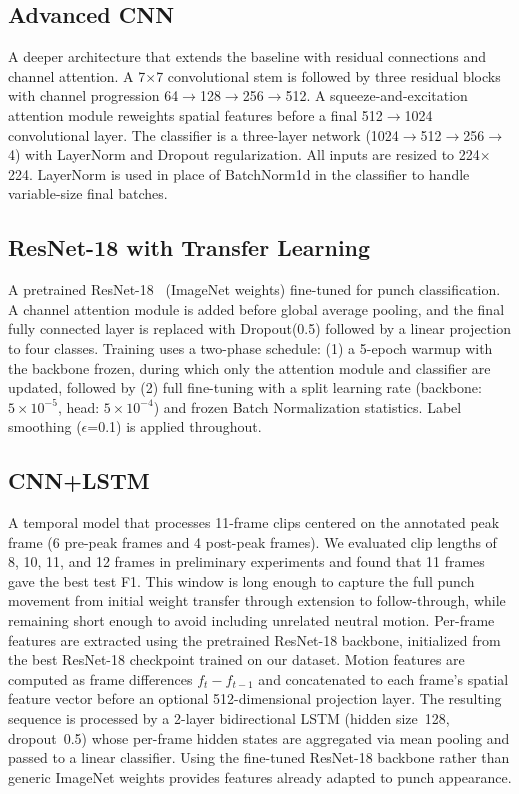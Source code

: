 \documentclass[conference]{IEEEtran}
\begin{document}
\subsection{Advanced CNN}
A deeper architecture that extends the baseline with residual connections and
channel attention. A 7$\times$7 convolutional stem is followed by three
residual blocks with channel progression 64$\to$128$\to$256$\to$512. A
squeeze-and-excitation attention module reweights spatial features before a
final 512$\to$1024 convolutional layer. The classifier is a three-layer
network (1024$\to$512$\to$256$\to$4) with LayerNorm and Dropout
regularization. All inputs are resized to 224$\times$224. LayerNorm is used
in place of BatchNorm1d in the classifier to handle variable-size final
batches.

\subsection{ResNet-18 with Transfer Learning}
A pretrained ResNet-18~\cite{he2016deep} (ImageNet weights) fine-tuned for
punch classification. A channel attention module is added before global
average pooling, and the final fully connected layer is replaced with
Dropout(0.5) followed by a linear projection to four classes. Training uses a
two-phase schedule: (1) a 5-epoch warmup with the backbone frozen, during
which only the attention module and classifier are updated, followed by (2)
full fine-tuning with a split learning rate (backbone: $5\times10^{-5}$,
head: $5\times10^{-4}$) and frozen Batch Normalization statistics. Label
smoothing ($\epsilon$=0.1) is applied throughout.

\subsection{CNN+LSTM}
A temporal model that processes 11-frame clips centered on the annotated peak
frame (6 pre-peak frames and 4 post-peak frames). We evaluated clip lengths
of 8, 10, 11, and 12 frames in preliminary experiments and found that 11
frames gave the best test F1. This window is long enough to capture the full
punch movement from initial weight transfer through extension to
follow-through, while remaining short enough to avoid including unrelated
neutral motion. Per-frame features are extracted using the pretrained ResNet-18
backbone, initialized from the best ResNet-18 checkpoint trained on our
dataset. Motion features are computed as frame differences $f_t - f_{t-1}$
and concatenated to each frame's spatial feature vector before an optional
512-dimensional projection layer. The resulting sequence is processed by a
2-layer bidirectional LSTM (hidden size~128, dropout~0.5) whose per-frame
hidden states are aggregated via mean pooling and passed to a linear
classifier. Using the fine-tuned ResNet-18 backbone rather than generic
ImageNet weights provides features already adapted to punch appearance.
\end{document}
